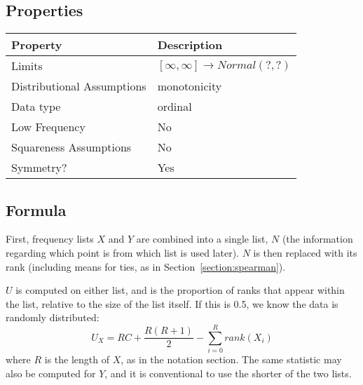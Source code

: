 \documentclass[11pt]{article}
\begin{document}

\subsection{Properties}
\begin{tabular}{| l || l |}
    \hline
    {\bf Property} & {\bf Description} \\
    \hline
    Limits & $[\infty, \infty] \to Normal(?, ?)$ \\ \hline

    Distributional Assumptions & monotonicity \\ \hline

    Data type & ordinal \\ \hline

    Low Frequency & No \\ \hline

    Squareness Assumptions & No \\ \hline
    
    Symmetry? & Yes \\ \hline

\end{tabular}


\subsection{Formula}
First, frequency lists $X$ and $Y$ are combined into a single list, $N$ (the information regarding which point is from which list is used later).  $N$ is then replaced with its rank (including means for ties, as in Section~\ref{section:spearman}).

$U$ is computed on either list, and is the proportion of ranks that appear within the list, relative to the size of the list itself.  If this is 0.5, we know the data is randomly distributed:
$$
U_X = RC + \frac{ R(R+1) }{ 2 } - \sum_{i=0}^{R}{ rank(X_i) }
$$
where $R$ is the length of $X$, as in the notation section.  The same statistic may also be computed for $Y$, and it is conventional to use the shorter of the two lists.
\end{document}
